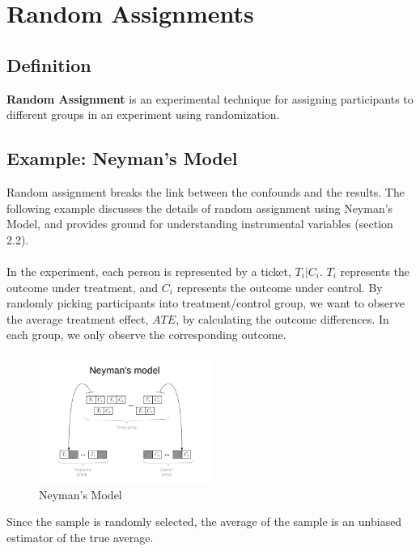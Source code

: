 
\section{Random Assignments}
\subsection{Definition}
\textbf{Random Assignment} is an experimental technique for assigning participants to different groups in an experiment using randomization.
\subsection{Example: Neyman's Model}
Random assignment breaks the link between the confounds and the results. The following example discusses the details of random assignment using Neyman's Model, and provides ground for understanding instrumental variables (section 2.2).
\\
\\
In the experiment, each person is represented by a ticket, $T_i$$|$$C_i$. $T_i$ represents the outcome under treatment, and $C_i$ represents the outcome under control. By randomly picking participants into treatment/control group, we want to observe the average treatment effect, $ATE$, by calculating the outcome differences. In each group, we only observe the corresponding outcome.

\begin{figure}[ht]
  \begin{center}
    \includegraphics[width=0.5\textwidth]{figures/natural-experiments-31-638.jpg}
    \caption{Neyman's Model
      }
    \label{fig:Neyman's Model}
  \end{center}
\end{figure}

Since the sample is randomly selected, the average of the sample is an unbiased estimator of the true average. 

